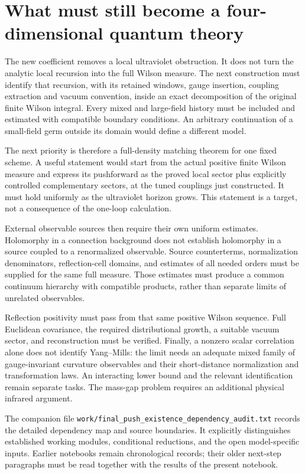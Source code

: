 \section{What must still become a four-dimensional quantum theory}
\label{pdh-existence-boundary}

The new coefficient removes a local ultraviolet obstruction. It does
not turn the analytic local recursion into the full Wilson measure.
The next construction must identify that recursion, with its retained
windows, gauge insertion, coupling extraction and vacuum convention,
inside an exact decomposition of the original finite Wilson integral.
Every mixed and large-field history must be included and estimated
with compatible boundary conditions. An arbitrary continuation of a
small-field germ outside its domain would define a different model.

The next priority is therefore a full-density matching theorem for
one fixed scheme. A useful statement would start from the actual
positive finite Wilson measure and express its pushforward as the
proved local sector plus explicitly controlled complementary sectors,
at the tuned couplings just constructed. It must hold uniformly as
the ultraviolet horizon grows. This statement is a target, not a
consequence of the one-loop calculation.

External observable sources then require their own uniform estimates.
Holomorphy in a connection background does not establish holomorphy
in a source coupled to a renormalized observable. Source counterterms,
normalization denominators, reflection-cell domains, and estimates
of all needed orders must be supplied for the same full measure.
Those estimates must produce a common continuum hierarchy with
compatible products, rather than separate limits of unrelated
observables.

Reflection positivity must pass from that same positive Wilson
sequence. Full Euclidean covariance, the required distributional
growth, a suitable vacuum sector, and reconstruction must be verified.
Finally, a nonzero scalar correlation alone does not identify
Yang--Mills: the limit needs an adequate mixed family of gauge-invariant
curvature observables and their short-distance normalization and
transformation laws. An interacting lower bound and the relevant
identification remain separate tasks. The mass-gap problem requires
an additional physical infrared argument.

The companion file
\texttt{work/final\_push\_existence\_dependency\_audit.txt}
records the detailed dependency map and source boundaries.
It explicitly distinguishes established working modules, conditional
reductions, and the open model-specific inputs. Earlier notebooks
remain chronological records; their older next-step paragraphs
must be read together with the results of the present notebook.

